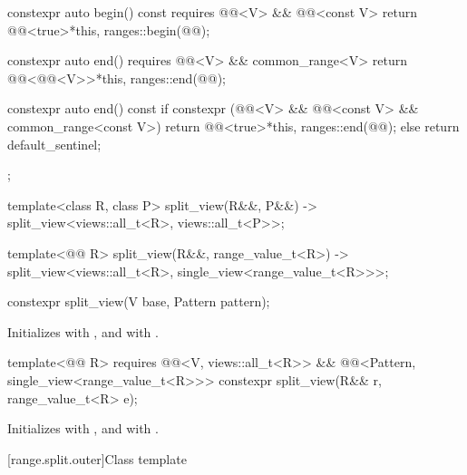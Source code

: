 \begin{codeblock}
{{    constexpr auto begin() const requires @@<V> && @@<const V> {
      return @@<true>{*this, ranges::begin(@@)};
    }

    constexpr auto end() requires @@<V> && common_range<V> {
      return @@<@@<V>>{*this, ranges::end(@@)};
    }

    constexpr auto end() const {
      if constexpr (@@<V> && @@<const V> && common_range<const V>)
        return @@<true>{*this, ranges::end(@@)};
      else
        return default_sentinel;
    }
  };

  template<class R, class P>
    split_view(R&&, P&&) -> split_view<views::all_t<R>, views::all_t<P>>;

  template<@@ R>
    split_view(R&&, range_value_t<R>)
      -> split_view<views::all_t<R>, single_view<range_value_t<R>>>;
}
\end{codeblock}

%
\begin{itemdecl}
constexpr split_view(V base, Pattern pattern);
\end{itemdecl}

\begin{itemdescr}
\pnum
\effects
Initializes  with , and
 with .
\end{itemdescr}

%
\begin{itemdecl}
template<@@ R>
  requires @@<V, views::all_t<R>> &&
           @@<Pattern, single_view<range_value_t<R>>>
constexpr split_view(R&& r, range_value_t<R> e);
\end{itemdecl}

\begin{itemdescr}
\pnum
\effects
Initializes  with , and
 with .
\end{itemdescr}

[range.split.outer]{Class template }

